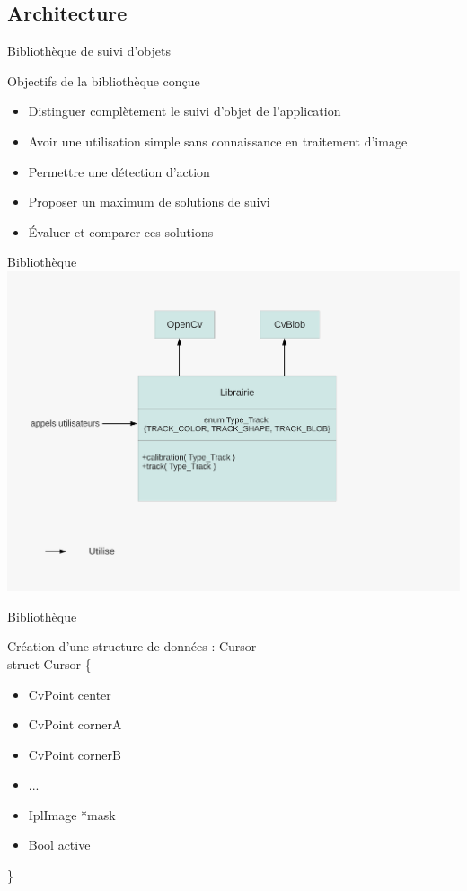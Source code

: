 \documentclass{beamer}
\begin{document}
		\subsection{Architecture}
		\begin{frame}{Bibliothèque de suivi d'objets}
			\begin{block}{Objectifs de la bibliothèque conçue}
				\begin{itemize}
				\item{Distinguer complètement le suivi d'objet de l'application}
				\item{Avoir une utilisation simple sans connaissance en traitement d'image}
				\item{Permettre une détection d'action}
				\item{Proposer un maximum de solutions de suivi}
				\item{Évaluer et comparer ces solutions}
				\end{itemize}
			\end{block}
		\end{frame}

		\begin{frame}{Bibliothèque}
			\includegraphics[scale=0.40]{schema-librairie.pdf}
		\end{frame}

		\begin{frame}{Bibliothèque}

		Création d'une structure de données : Cursor\\
		struct Cursor \{
		\begin{itemize}
			\item{CvPoint center}
			\item{CvPoint cornerA}
			\item{CvPoint cornerB}
			\item{...}
			\item{IplImage *mask}
			\item{Bool active}
		\end{itemize}
		\} \\
		\end{frame}
		
\end{document}
